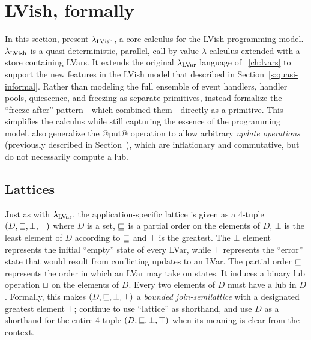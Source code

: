 \section{LVish, formally}\label{s:quasi-formal}

In this section,  present $\lambda_{\textrm{LVish}}$, a core calculus for the
LVish programming model. $\lambda_{\textrm{LVish}}$ is a quasi-deterministic,
parallel, call-by-value $\lambda$-calculus extended with a store
containing LVars.  It extends the original $\lambda_{\textrm{LVar}}$ language of
~\ref{ch:lvars} to support the new features in the LVish model
that  described in Section~\ref{s:quasi-informal}. Rather than
modeling the full ensemble of event handlers, handler pools,
quiescence, and freezing as separate primitives,  instead formalize
the ``freeze-after'' pattern---which combined them---directly as a
primitive.  This simplifies the calculus while still capturing the
essence of the programming model.   also generalize the @put@
operation to allow arbitrary \emph{update operations} (previously
described in
Section~\either{\ref{subsection:lvars-generalizing-from-least-upper-bound-writes}}{\ref{s:lvars-generalizing}}),
which are inflationary and commutative, but do not necessarily compute
a lub.

\subsection{Lattices}

Just as with $\lambda_{\textrm{LVar}}$, the application-specific lattice is given
as a 4-tuple $(D, \sqsubseteq, \bot, \top)$ where $D$ is a set,
$\sqsubseteq$ is a partial order on the elements of $D$, $\bot$ is the
least element of $D$ according to $\sqsubseteq$ and $\top$ is the
greatest.  The $\bot$ element represents the initial ``empty'' state
of every LVar, while $\top$ represents the ``error'' state that would
result from conflicting updates to an LVar.  The partial order
$\sqsubseteq$ represents the order in which an LVar may take on states.
It induces a binary lub operation $ \sqcup $ on the elements of
$D$.  Every two elements of $D$ must have a lub in $D$.  Formally,
this makes $(D, \sqsubseteq, \bot, \top)$ a \emph{bounded
  join-semilattice} with a designated greatest element $\top$; 
continue to use ``lattice'' as shorthand, and  use $D$ as a shorthand
for the entire 4-tuple $(D, \sqsubseteq, \bot, \top)$ when its meaning is
clear from the context. 

